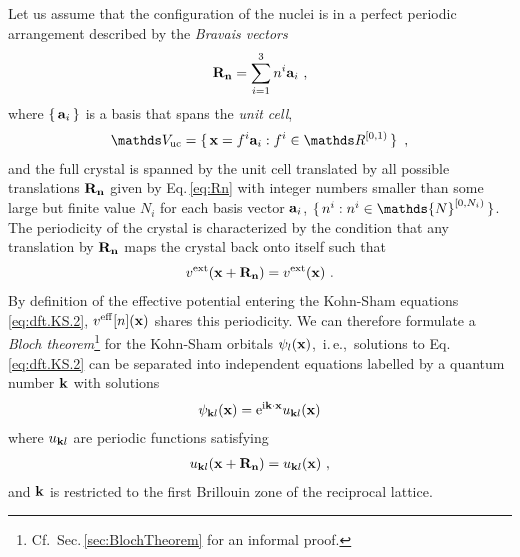 Let us assume that the configuration of the nuclei is in a perfect periodic arrangement described by the 
\emph{Bravais vectors}
\begin{align}
	{\bf R}_{\bf n} 
		= \sum_{i=1}^{3} n^i {\bf a}_i~,
	\label{eq:Rn}
\end{align}
where $\set{{\bf a}_i}$ is a basis that spans
the \emph{unit cell},
\begin{align}
	\mathds V_{\rm uc}
		= \set{{\bf x} = f^i {\bf a}_i : f^i \in \mathds R^{[0, 1)}}~,
	\label{eq:dft.Bloch.unitcell}
\end{align}
\REM{Use $[-0.5, 0.5)$}
and the full crystal is spanned by the unit cell translated by all possible translations $\bf R_n$ given by Eq.\,\eqref{eq:Rn} with integer numbers smaller than some large but finite value $N_i$ for each basis vector ${\bf a}_i$, $\set{n^i : n^i \in \mathds{N}^{[0, N_i)}}$. The periodicity of the crystal is characterized by the condition that any translation by $\bf R_n$ maps the crystal back onto itself such that
\begin{align}
	v^{\rm ext} ({\bf x} + {\bf R_n}) 
		= v^{\rm ext} ({\bf x})~.
	\label{eq:dft.Bloch.1}
\end{align}
By definition of the effective potential entering the Kohn-Sham equations \eqref{eq:dft.KS.2}, $v^{\rm eff} [n] ({\bf x})$ shares this periodicity. We can therefore formulate a \emph{Bloch theorem}\footnote{Cf.~Sec.\,\ref{sec:BlochTheorem} for an informal proof.}
for the Kohn-Sham orbitals $\psi_l ({\bf x})$,~i.\,e.,~solutions to Eq.\,\eqref{eq:dft.KS.2} can be separated into independent equations labelled by a quantum number $\bf k$ with solutions
\begin{align}
	\psi_{{\bf k} l} ({\bf x}) 
		= {\rm e}^{{\rm i} {\bf k} \cdot {\bf x}} u_{{\bf k} l} ({\bf x})
	\label{eq:dft.Bloch.2}
\end{align}
where $u_{{\bf k} l}$ are periodic functions satisfying
\begin{align}
	u_{{\bf k} l} ({\bf x} + {\bf R_n})
		= u_{{\bf k} l} ({\bf x})~,
	\label{eq:dft.Bloch.3}
\end{align}
and $\bf k$ is restricted to the first Brillouin zone of the reciprocal lattice.

